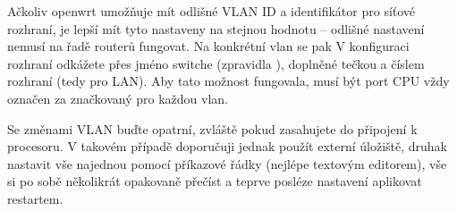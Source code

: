 Ačkoliv \gls{openwrt} umožňuje mít odlišné VLAN ID a identifikátor pro síťové
rozhraní, je lepší mít tyto nastaveny na stejnou hodnotu -- odlišné nastavení
nemusí na řadě routerů fungovat. Na konkrétní \gls{vlan} se pak V konfiguraci
rozhraní odkážete přes jméno switche (zpravidla ), doplněné tečkou
a číslem rozhraní (tedy  pro LAN). Aby tato možnost fungovala, musí
být port CPU vždy označen za značkovaný pro každou \gls{vlan}.

Se změnami VLAN buďte opatrní, zvláště pokud zasahujete do připojení k procesoru.
V takovém případě doporučuji jednak použít externí úložiště, druhak nastavit
vše najednou pomocí příkazové řádky (nejlépe textovým editorem), vše si po sobě
několikrát opakovaně přečíst a teprve posléze nastavení aplikovat restartem.

